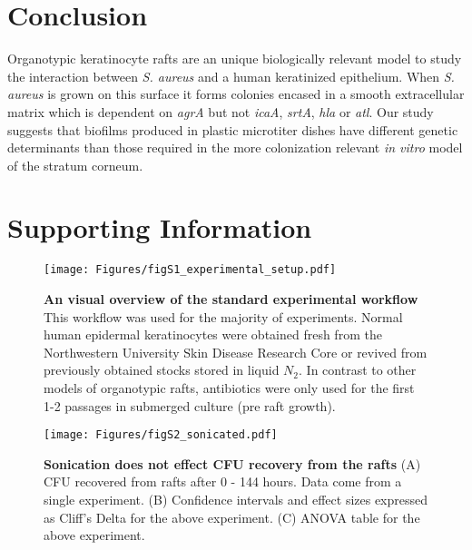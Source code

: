\documentclass[10pt,letterpaper]{article}
\newcommand{\beginsupplement}{%
        \setcounter{table}{0}
        \renewcommand{\thetable}{S\arabic{table}}%
        \setcounter{figure}{0}
        \renewcommand{\thefigure}{S\arabic{figure}}%
     }
\begin{document}
\section*{Conclusion}
Organotypic keratinocyte rafts are an unique biologically relevant model to study the interaction between \textit{S. aureus} and a human keratinized epithelium.
When \textit{S. aureus} is grown on this surface it forms colonies encased in a smooth extracellular matrix which is dependent on \textit{agrA} but not \textit{icaA}, \textit{srtA}, \textit{hla} or \textit{atl}.
Our study suggests that biofilms produced in plastic microtiter dishes have different genetic determinants than those required in the more colonization relevant \textit{in vitro} model of the stratum corneum.

\beginsupplement

\section*{Supporting Information}

\begin{figure}[H]
\begin{adjustwidth}{-2.25in}{0in}
\texttt{[image: Figures/figS1\_experimental\_setup.pdf]}
\caption[An visual overview of the standard experimental workflow]{
\textbf{An visual overview of the standard experimental workflow}
This workflow was used for the majority of experiments. Normal human epidermal keratinocytes were obtained fresh from the Northwestern University Skin Disease Research Core or revived from previously obtained stocks stored in liquid $N_2$. In contrast to other models of organotypic rafts, antibiotics were only used for the first 1-2 passages in submerged culture (pre raft growth).}
\label{figS1}
\end{adjustwidth}
\end{figure}

\begin{figure}[H]
\begin{adjustwidth}{-2.25in}{0in}
\texttt{[image: Figures/figS2\_sonicated.pdf]}
\caption[Sonication does not effect CFU recovery from the rafts]{
\textbf{Sonication does not effect CFU recovery from the rafts} 
	(A) CFU recovered from rafts after 0 - 144 hours. Data come from a single experiment.
	(B) Confidence intervals and effect sizes expressed as Cliff's Delta for the above experiment.
	(C) ANOVA table for the above experiment.}
    \label{figS2}
    \end{adjustwidth}
\end{figure}
\end{document}
